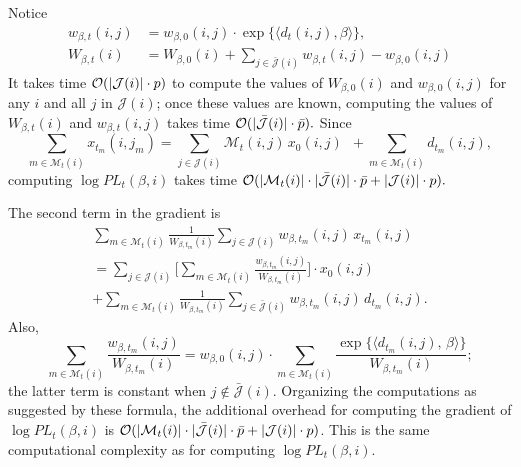 \documentclass[aoas,preprint]{imsart}
\begin{document}
Notice
\begin{align*}
    w_{\beta,t}(i,j)
        &=
            w_{\beta,0}(i,j)
            \cdot
            \exp\{ \langle d_t(i,j), \beta \rangle \}, \\
    W_{\beta,t}(i)
        &=
            W_{\beta,0}(i)
            +
            \sum_{j \in \mathcal{\bar J}(i)}
                w_{\beta,t}(i,j) - w_{\beta,0}(i,j)
\end{align*}
It takes time $\mathcal{O}(|\mathcal{J}(i)| \cdot p)$ to compute the values of
$W_{\beta,0}(i)$ and $w_{\beta,0}(i,j)$ for any $i$ and all
$j$ in $\mathcal{J}(i)$; once these values are known, computing the values
of $W_{\beta,t}(i)$ and $w_{\beta,t}(i,j)$ takes time
\(
    \mathcal{O}(|\mathcal{\bar J}(i)| \cdot \bar p).
\)
Since
\[
    \sum_{m\in \mathcal{M}_t(i)}
        x_{t_m}\!(i,j_m)
        =
            \sum_{j \in \mathcal{J}(i)}
                \mathcal{M}_t(i,j) \, x_0(i,j)
            \,\,\,
            +
            \sum_{m \in \mathcal{M}_t(i)}
                d_{t_m}\!(i,j),
\]
computing $\log \mathit{PL}_t(\beta, i)$ takes time
\(
    \mathcal{O}(
        |\mathcal{M}_t(i)| \cdot |\mathcal{\bar J}(i)| \cdot \bar p
        +
        |\mathcal{J}(i)| \cdot p
    ).
\)

The second term in the gradient is
\begin{multline*}
    \sum_{m \in \mathcal{M}_t(i)}
        \frac{1}{W_{\beta,t_m}\!(i)}
        \sum_{j \in \mathcal{J}(i)}
            w_{\beta,t_m}\!(i,j)
            \,
            x_{t_m}\!(i,j) \\
    =
    \sum_{j \in \mathcal{J}(i)}
    \bigg[
        \sum_{m \in \mathcal{M}_t(i)}
            \frac{w_{\beta,t_m}\!(i,j)}{W_{\beta,t_m}\!(i)}
    \bigg]
    \cdot
    x_0(i,j) \\
    +
    \sum_{m \in \mathcal{M}_t(i)}
        \frac{1}{W_{\beta, t_m}\!(i)}
        \sum_{j \in \mathcal{\bar J}(i)}
            w_{\beta,t_m}\!(i,j)
            \,
            d_{t_m}\!(i,j).
\end{multline*}
Also,
\[
    \sum_{m \in \mathcal{M}_t(i)}
        \frac{w_{\beta,t_m}\!(i,j)}{W_{\beta,t_m}\!(i)}
    =
        w_{\beta,0}(i,j)
        \cdot
        \sum_{m \in \mathcal{M}_t(i)}
            \frac{
                \exp\{\langle d_{t_m}\!(i,j), \, \beta \rangle \}
            }{
                W_{\beta,t_m}\!(i)
            };
\]
the latter term is constant when $j \notin \mathcal{\bar J}(i)$.
Organizing the computations as suggested by these formula,
the additional overhead for computing the gradient of
$\log \mathit{PL}_t(\beta,i)$ is
\(
    \mathcal{O}(
        |\mathcal{M}_t(i)| \cdot |\mathcal{\bar J}(i)| \cdot \bar p
        +
        |\mathcal{J}(i)| \cdot p
    )
\).
This is the same computational complexity as for computing
$\log \mathit{PL}_t(\beta,i)$.
\end{document}
